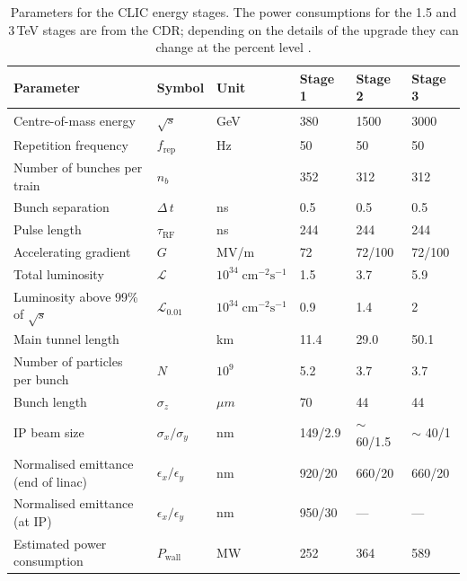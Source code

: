 \begin{table}
\caption{Parameters for the CLIC energy stages. The power consumptions for the 1.5 and 3\,TeV stages are from the CDR; depending on the details of the upgrade they can change at the percent level \cite{UpdatedCLICBaseline}.}
\label{table:clicbeamparameters}
\centering
\begin{tabular}{l l l l l l}
\toprule
\textbf{Parameter}                  & \textbf{Symbol}         & \textbf{Unit}& \textbf{Stage 1} & \textbf{Stage 2} & \textbf{Stage 3} \\
\midrule
Centre-of-mass energy               & $\sqrt{s}$                &GeV                                        & 380 & 1500 & 3000\\
Repetition frequency                & $f_{\text{rep}}$        &Hz                                         & 50 & 50 & 50\\
Number of bunches per train         & $n_{b}$                 &                                           & 352 & 312 & 312\\
Bunch separation                    & $\Delta\,t$             &ns                                         & 0.5 & 0.5 & 0.5\\
Pulse length                        & $\tau_{\text{RF}}$      &ns                                         &244 &244 &244\\
\midrule
Accelerating gradient               & $G$                     &MV/m                                       & 72 & 72/100 & 72/100\\
\midrule
Total luminosity                    & $\mathcal{L}$           &$10^{34}\;\text{cm}^{-2}\text{s}^{-1}$     & 1.5 & 3.7 & 5.9 \\
Luminosity above 99\% of $\sqrt{s}$   & $\mathcal{L}_{0.01}$    &$10^{34}\;\text{cm}^{-2}\text{s}^{-1}$     & 0.9 & 1.4 & 2\\
\midrule
Main tunnel length                  &                         &km                                         & 11.4 & 29.0 & 50.1\\
Number of particles per bunch                    & $N$                     &$10^9$                                     & 5.2 & 3.7 & 3.7\\
Bunch length                        & $\sigma_z$              &$\mu m$                                  & 70 & 44 & 44\\
IP beam size                        & $\sigma_x/\sigma_y$     &nm                                         & 149/2.9 & $\sim$ 60/1.5 & $\sim$ 40/1\\
Normalised emittance (end of linac) & $\epsilon_x/\epsilon_y$ &nm                                         & 920/20 & 660/20 & 660/20\\
Normalised emittance (at IP)        & $\epsilon_x/\epsilon_y$ &nm                                         & 950/30 & ---    &---\\
Estimated power consumption                        & $P_{\text{wall}}$         &MW                                & 252    & 364    & 589\\
\bottomrule
\end{tabular}
\end{table}

